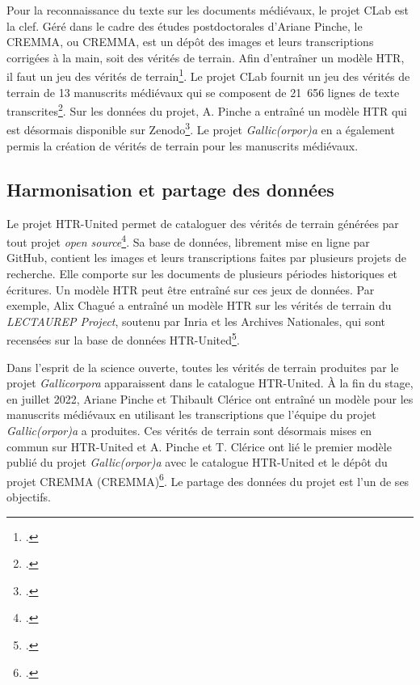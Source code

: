 \documentclass[class=article, crop=false]{standalone}
\begin{document}
Pour la reconnaissance du texte sur les documents médiévaux, le projet \Gls{CLab} est la clef. Géré dans le cadre des études postdoctorales d'Ariane Pinche, le \acrlong{CREMMA}, ou \acrshort{CREMMA}, est un dépôt des images et leurs transcriptions corrigées à la main, soit des vérités de terrain. Afin d'entraîner un modèle \acrshort{HTR}, il faut un jeu des vérités de terrain\footcite{chagueHTRUnitedMutualisonsVerite2021}. Le projet \Gls{CLab} fournit un jeu des vérités de terrain de 13 manuscrits médiévaux qui se composent de 21~656 lignes de texte transcrites\footcite{pincheCremmaLabProjectTranscription2022}. Sur les données du projet, A. Pinche a entraîné un modèle \acrshort{HTR} qui est désormais disponible sur Zenodo\footcite{pincheHTRModelCremma2022}. Le projet \textit{Gallic(orpor)a} en a également permis la création de vérités de terrain pour les manuscrits médiévaux.

\subsection{Harmonisation et partage des données}
Le projet \Gls{HTR-United} permet de cataloguer des vérités de terrain générées par tout projet \textit{open source}\footcite{chagueHTRUnitedHtrunitedV02022}. Sa base de données, librement mise en ligne par GitHub, contient les images et leurs transcriptions faites par plusieurs projets de recherche. Elle comporte sur les documents de plusieurs périodes historiques et écritures. Un modèle \acrshort{HTR} peut être entraîné sur ces jeux de données. Par exemple, Alix Chagué a entraîné un modèle \acrshort{HTR} sur les vérités de terrain du \textit{LECTAUREP Project}, soutenu par \Gls{Inria} et les Archives Nationales, qui sont recensées sur la base de données \Gls{HTR-United}\footcite{chagueLECTAUREPContemporaryFrench2022}.

Dans l'esprit de la science ouverte, toutes les vérités de terrain produites par le projet \textit{Gallicorpora} apparaissent dans le catalogue \Gls{HTR-United}. À la fin du stage, en juillet 2022, Ariane Pinche et Thibault Clérice ont entraîné un modèle pour les manuscrits médiévaux en utilisant les transcriptions que l'équipe du projet \textit{Gallic(orpor)a} a produites. Ces vérités de terrain sont désormais mises en commun sur \Gls{HTR-United} et A. Pinche et T. Clérice ont lié le premier modèle publié du projet \textit{Gallic(orpor)a} avec le catalogue \Gls{HTR-United} et le dépôt du projet \acrshort{CREMMA} (\acrlong{CREMMA})\footcite{pincheHTRUnitedCremmamedievalCortado2022}. Le partage des données du projet est l'un de ses objectifs.
\end{document}
